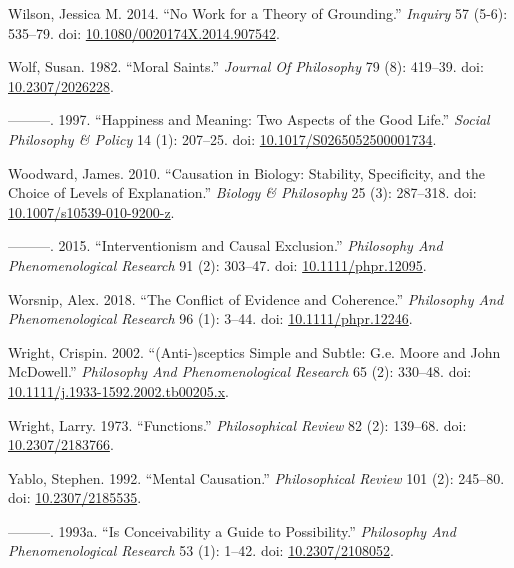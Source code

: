 \documentclass[
  10pt,
  letterpaper,
  DIV=11,
  numbers=noendperiod,
  twoside]{scrartcl}
\newlength{\cslhangindent}
\newenvironment{CSLReferences}[2] %
 {\begin{list}{}{%
  \setlength{\itemindent}{0pt}
  \setlength{\leftmargin}{0pt}
  \setlength{\parsep}{0pt}
  \ifodd #1
   \setlength{\leftmargin}{\cslhangindent}
   \setlength{\itemindent}{-1\cslhangindent}
  \fi
  \setlength{\itemsep}{#2\baselineskip}}}
 {\end{list}}
\begin{document}
\begin{CSLReferences}{1}{0}
Wilson, Jessica M. 2014. {``No Work for a Theory of Grounding.''}
\emph{Inquiry} 57 (5-6): 535--79. doi:
\href{https://doi.org/10.1080/0020174X.2014.907542}{10.1080/0020174X.2014.907542}.

Wolf, Susan. 1982. {``Moral Saints.''} \emph{Journal Of Philosophy} 79
(8): 419--39. doi:
\href{https://doi.org/10.2307/2026228}{10.2307/2026228}.

---------. 1997. {``Happiness and Meaning: Two Aspects of the Good
Life.''} \emph{Social Philosophy \& Policy} 14 (1): 207--25. doi:
\href{https://doi.org/10.1017/S0265052500001734}{10.1017/S0265052500001734}.

Woodward, James. 2010. {``Causation in Biology: Stability, Specificity,
and the Choice of Levels of Explanation.''} \emph{Biology \& Philosophy}
25 (3): 287--318. doi:
\href{https://doi.org/10.1007/s10539-010-9200-z}{10.1007/s10539-010-9200-z}.

---------. 2015. {``Interventionism and Causal Exclusion.''}
\emph{Philosophy And Phenomenological Research} 91 (2): 303--47. doi:
\href{https://doi.org/10.1111/phpr.12095}{10.1111/phpr.12095}.

Worsnip, Alex. 2018. {``The Conflict of Evidence and Coherence.''}
\emph{Philosophy And Phenomenological Research} 96 (1): 3--44. doi:
\href{https://doi.org/10.1111/phpr.12246}{10.1111/phpr.12246}.

Wright, Crispin. 2002. {``(Anti-)sceptics Simple and Subtle: G.e. Moore
and John McDowell.''} \emph{Philosophy And Phenomenological Research} 65
(2): 330--48. doi:
\href{https://doi.org/10.1111/j.1933-1592.2002.tb00205.x}{10.1111/j.1933-1592.2002.tb00205.x}.

Wright, Larry. 1973. {``Functions.''} \emph{Philosophical Review} 82
(2): 139--68. doi:
\href{https://doi.org/10.2307/2183766}{10.2307/2183766}.

Yablo, Stephen. 1992. {``Mental Causation.''} \emph{Philosophical
Review} 101 (2): 245--80. doi:
\href{https://doi.org/10.2307/2185535}{10.2307/2185535}.

---------. 1993a. {``Is Conceivability a Guide to Possibility.''}
\emph{Philosophy And Phenomenological Research} 53 (1): 1--42. doi:
\href{https://doi.org/10.2307/2108052}{10.2307/2108052}.


\end{CSLReferences}
\end{document}
